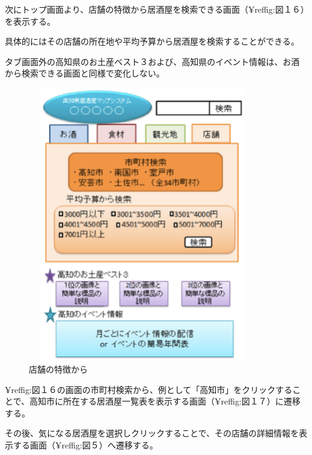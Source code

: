 \documentclass[a4j,titlepage]{jarticle}
\begin{document}
次にトップ画面より、店舗の特徴から居酒屋を検索できる画面（¥ref{fig:図１６}）を表示する。



具体的にはその店舗の所在地や平均予算から居酒屋を検索することができる。



タブ画面外の高知県のお土産ベスト３および、高知県のイベント情報は、お酒から検索できる画面と同様で変化しない。
\clearpage
\begin {figure}[!htbp]
    \begin{center}
    \includegraphics [height=12cm, width=10cm]{16.eps}
    \caption {店舗の特徴から}
    \label {fig:16}
    \end{center}
\end {figure}



¥ref{fig:図１６}の画面の市町村検索から、例として「高知市」をクリックすることで、高知市に所在する居酒屋一覧表を表示する画面（¥ref{fig:図１７}）に遷移する。



その後、気になる居酒屋を選択しクリックすることで、その店舗の詳細情報を表示する画面（¥ref{fig:図５}）へ遷移する。
\clearpage
\end{document}
